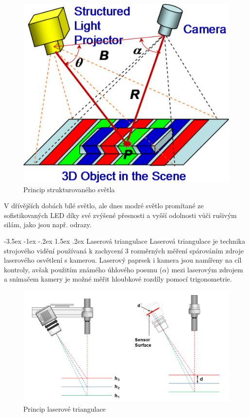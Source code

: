 \documentclass[a4paper,11pt]{article}
\makeatletter
\theoremstyle{definition}
\renewcommand\subsection{\@startsection {subsection}{1}{\z@}%
                                   {-3.5ex \@plus -1ex \@minus -.2ex}%
                                   {1.5ex \@plus.2ex}%
                                   {\normalsize\bfseries}}
\makeatother
\begin{document}
\begin{figure}[h]
\begin{center}
\includegraphics[scale=2.6]{image/getImage.jpg}
\caption{Princip strukturovaného světla \cite{Geng:11}}
\label{fig:3}
\end{center}
\end{figure}

V dřívějších dobách bílé světlo, ale dnes modré světlo promítané ze sofistikovaných LED díky své zvýšené přesnosti a vyšší odolnosti vůči rušivým silám, jako jsou např. odrazy. 


\subsection{Laserová triangulace}
\label{subsec:3}
Laserová triangulace je technika strojového vidění používaná k zachycení 3 rozměrných měření spárováním zdroje laserového osvětlení s kamerou. Laserový paprsek i kamera jsou namířeny na cíl kontroly, avšak použitím známého úhlového posunu ($\alpha$) mezi laserovým zdrojem a snímačem kamery je možné měřit hloubkové rozdíly pomocí trigonometrie. \cite{649437}

\begin{figure}[h]
\begin{center}
\includegraphics[scale=0.35]{image/lasertriangular.png}
\caption{Princip laserové triangulace \cite{649437}}
\label{fig:4}
\end{center}
\end{figure}
\end{document}
